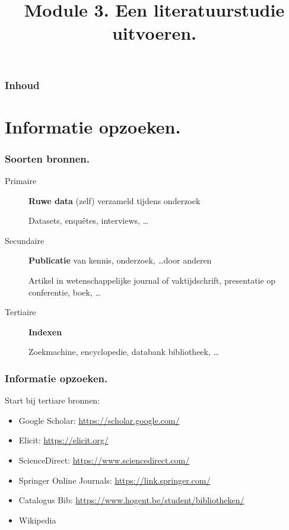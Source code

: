 \documentclass[aspectratio=169]{beamer}
\title{Module 3. Een literatuurstudie uitvoeren.}
\subtitle{\coursename}
\author{\lecturers}   %
\date{\academicyear}
\begin{document}
\begin{frame}
  \maketitle
\end{frame}

\begin{frame}
  \frametitle{Inhoud}

  \tableofcontents
\end{frame}

\section{Informatie opzoeken.}

\begin{frame}
  \frametitle{Soorten bronnen.}

  \begin{description}
    \item[Primaire] \textbf{Ruwe data} (zelf) verzameld tijdens onderzoek

      Datasets, enquêtes, interviews, \ldots

    \item[Secundaire] \textbf{Publicatie} van kennis, onderzoek, \ldots door anderen

      Artikel in wetenschappelijke journal of vaktijdschrift, presentatie op conferentie, boek, \ldots

    \item[Tertiaire] \textbf{Indexen}

      Zoekmachine, encyclopedie, databank bibliotheek, \ldots

  \end{description}

\end{frame}

\begin{frame}
  \frametitle{Informatie opzoeken.}

  Start bij \alert{tertiare} bronnen:

  \begin{itemize}
    \item Google Scholar: \url{https://scholar.google.com/}
    \item Elicit: \url{https://elicit.org/}
    \item ScienceDirect: \url{https://www.sciencedirect.com/}
    \item Springer Online Journals: \url{https://link.springer.com/}
    \item Catalogus Bib: \url{https://www.hogent.be/student/bibliotheken/}
    \item Wikipedia
  \end{itemize}
\end{frame}
\end{document}
